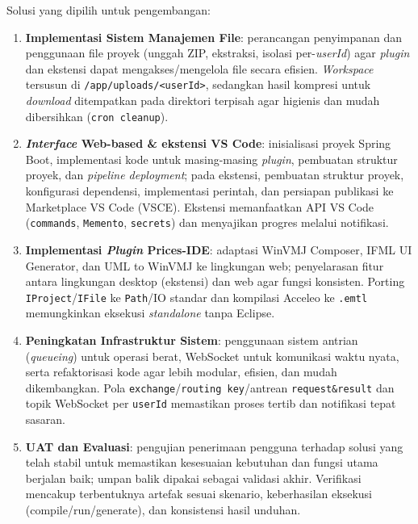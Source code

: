 \documentclass[12pt,a4paper,onecolumn]{article}
\begin{document}
Solusi yang dipilih untuk pengembangan:
\begin{enumerate}[leftmargin=*, label=\arabic*), itemsep=0.4\baselineskip]
  \item \textbf{Implementasi Sistem Manajemen File}: perancangan penyimpanan dan penggunaan file proyek (unggah ZIP, ekstraksi, isolasi per-\textit{{userId}}) agar \textit{plugin} dan ekstensi dapat mengakses/mengelola file secara efisien. \textit{Workspace} tersusun di \texttt{/app/uploads/<userId>}, sedangkan hasil kompresi untuk \textit{download} ditempatkan pada direktori terpisah agar higienis dan mudah dibersihkan (\texttt{cron cleanup}).
  \item \textbf{\textit{Interface} Web-based \& ekstensi VS Code}: inisialisasi proyek Spring Boot, implementasi kode untuk masing-masing \textit{plugin}, pembuatan struktur proyek, dan \textit{pipeline deployment}; pada ekstensi, pembuatan struktur proyek, konfigurasi dependensi, implementasi perintah, dan persiapan publikasi ke Marketplace VS Code (VSCE). Ekstensi memanfaatkan API VS Code (\texttt{commands}, \texttt{Memento}, \texttt{secrets}) dan menyajikan progres melalui notifikasi.
  \item \textbf{Implementasi \textit{Plugin} Prices-IDE}: adaptasi WinVMJ Composer, IFML UI Generator, dan UML to WinVMJ ke lingkungan web; penyelarasan fitur antara lingkungan desktop (ekstensi) dan web agar fungsi konsisten. Porting \texttt{IProject}/\texttt{IFile} ke \texttt{Path}/IO standar dan kompilasi Acceleo ke \texttt{.emtl} memungkinkan eksekusi \textit{standalone} tanpa Eclipse.
  \item \textbf{Peningkatan Infrastruktur Sistem}: penggunaan sistem antrian (\textit{queueing}) untuk operasi berat, WebSocket untuk komunikasi waktu nyata, serta refaktorisasi kode agar lebih modular, efisien, dan mudah dikembangkan. Pola \texttt{exchange}/\texttt{routing key}/antrean \texttt{request\&result} dan topik WebSocket per \texttt{userId} memastikan proses tertib dan notifikasi tepat sasaran.
  \item \textbf{UAT dan Evaluasi}: pengujian penerimaan pengguna terhadap solusi yang telah stabil untuk memastikan kesesuaian kebutuhan dan fungsi utama berjalan baik; umpan balik dipakai sebagai validasi akhir. Verifikasi mencakup terbentuknya artefak sesuai skenario, keberhasilan eksekusi (compile/run/generate), dan konsistensi hasil unduhan.
\end{enumerate}

\end{document}
